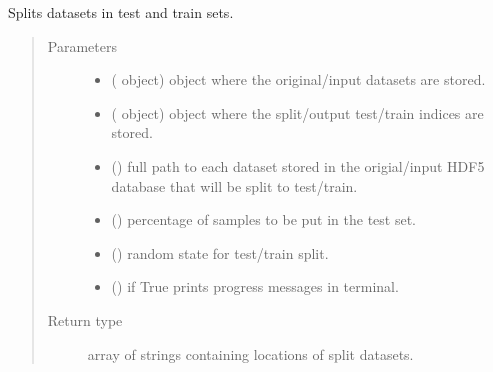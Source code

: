 \documentclass[letterpaper,10pt,english]{sphinxmanual}
\begin{document}
\begin{fulllineitems}

\begin{fulllineitems}
\label{\detokenize{data:mleap.data.data.Data.split_datasets}}
Splits datasets in test and train sets.
\begin{quote}\begin{description}
\item[{Parameters}] \leavevmode\begin{itemize}
\item {} 
 ({\hyperref[\detokenize{shared:mleap.shared.files_io.FilesIO}]{}} object) \textendash{} {\hyperref[\detokenize{shared:mleap.shared.files_io.FilesIO}]{}} object where the original/input datasets are stored.

\item {} 
 ({\hyperref[\detokenize{shared:mleap.shared.files_io.FilesIO}]{}} object) \textendash{} {\hyperref[\detokenize{shared:mleap.shared.files_io.FilesIO}]{}} object where the split/output test/train indices are stored.

\item {} 
 () \textendash{} full path to each dataset stored in the origial/input HDF5 database that will be split to test/train.

\item {} 
 () \textendash{} percentage of samples to be put in the test set.

\item {} 
 () \textendash{} random state for test/train split.

\item {} 
 () \textendash{} if True prints progress messages in terminal.

\end{itemize}

\item[{Return type}] \leavevmode
array of strings containing locations of split datasets.

\end{description}\end{quote}

\end{fulllineitems}


\end{fulllineitems}
\end{document}
